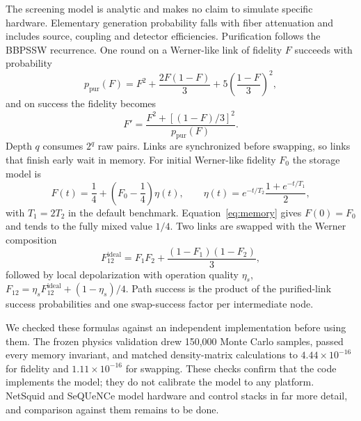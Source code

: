 \documentclass[pdflatex,sn-nature]{sn-jnl}
\theoremstyle{plain}
\theoremstyle{remark}
\begin{document}
The screening model is analytic and makes no claim to simulate specific hardware. Elementary generation probability falls with fiber attenuation and includes source, coupling and detector efficiencies. Purification follows the BBPSSW recurrence\cite{bennett1996}. One round on a Werner-like link\cite{werner1989} of fidelity $F$ succeeds with probability
\begin{equation}
 p_{\mathrm{pur}}(F)=F^2+\frac{2F(1-F)}{3}+5\left(\frac{1-F}{3}\right)^2,
\end{equation}
and on success the fidelity becomes
\begin{equation}
 F'=\frac{F^2+[(1-F)/3]^2}{p_{\mathrm{pur}}(F)}.
\end{equation}
Depth $q$ consumes $2^q$ raw pairs. Links are synchronized before swapping, so links that finish early wait in memory. For initial Werner-like fidelity $F_0$ the storage model is
\begin{equation}
F(t)=\frac14+\left(F_0-\frac14\right)\eta(t),\qquad
\eta(t)=e^{-t/T_2}\frac{1+e^{-t/T_1}}{2},\label{eq:memory}
\end{equation}
with $T_1=2T_2$ in the default benchmark. Equation~\ref{eq:memory} gives $F(0)=F_0$ and tends to the fully mixed value $1/4$. Two links are swapped with the Werner composition
\begin{equation}
F_{12}^{\mathrm{ideal}}=F_1F_2+\frac{(1-F_1)(1-F_2)}{3},
\end{equation}
followed by local depolarization with operation quality $\eta_s$, $F_{12}=\eta_sF_{12}^{\mathrm{ideal}}+(1-\eta_s)/4$. Path success is the product of the purified-link success probabilities and one swap-success factor per intermediate node.

We checked these formulas against an independent implementation before using them. The frozen physics validation drew 150,000 Monte Carlo samples, passed every memory invariant, and matched density-matrix calculations to $4.44\times10^{-16}$ for fidelity and $1.11\times10^{-16}$ for swapping. These checks confirm that the code implements the model; they do not calibrate the model to any platform. NetSquid\cite{coopmans2021} and SeQUeNCe\cite{wu2021} model hardware and control stacks in far more detail, and comparison against them remains to be done.
\end{document}
